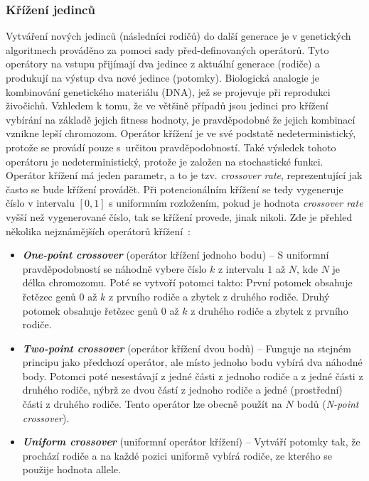 \subsubsection{Křížení jedinců}
\label{krizeniGA}
Vytváření nových jedinců (následníci rodičů) do další generace je v genetických algoritmech prováděno za pomoci sady před-definovaných operátorů. Tyto operátory na vstupu přijímají dva jedince z aktuální generace (rodiče) a produkují na výstup dva nové jedince (potomky). Biologická analogie je kombinování genetického materiálu (DNA), jež se projevuje při reprodukci živočichů. Vzhledem k tomu, že ve většině případů jsou jedinci pro křížení vybírání na základě jejich fitness hodnoty, je pravděpodobné že jejich kombinací vznikne lepší chromozom. Operátor křížení je ve své podstatě nedeterministický, protože se provádí pouze s~určitou pravděpodobností. Také výsledek tohoto operátoru je nedeterministický, protože je založen na stochastické funkci. Operátor křížení má jeden parametr, a to je tzv. \emph{crossover rate}, reprezentující jak často se bude křížení provádět. Při potencionálním křížení se tedy vygeneruje číslo v intervalu $[0,1]$ s uniformním rozložením, pokud je hodnota \emph{crossover rate} vyšší než vygenerované číslo, tak se křížení provede, jinak nikoli. Zde je přehled několika nejznámějších operátorů křížení~\cite{GAoptimisModel, GAstudy}:

\begin{itemize}
    \item \textbf{\emph{One-point crossover}} (operátor křížení jednoho bodu) -- S uniformní pravděpodobností se náhodně vybere číslo $k$ z intervalu $1$ až $N$, kde $N$ je délka chromozomu. Poté se vytvoří potomci takto: První potomek obsahuje řetězec genů $0$ až $k$ z prvního rodiče a zbytek z druhého rodiče. Druhý potomek obsahuje řetězec genů $0$ až $k$ z druhého rodiče a zbytek z prvního rodiče.
    \item \textbf{\emph{Two-point crossover}} (operátor křížení dvou bodů) -- Funguje na stejném principu jako předchozí operátor, ale místo jednoho bodu vybírá dva náhodné body. Potomci poté nesestávají z jedné části z jednoho rodiče a z jedné části z druhého rodiče, nýbrž ze dvou částí z jednoho rodiče a jedné (prostřední) části z druhého rodiče. Tento operátor lze obecně použít na $N$ bodů (\emph{N-point crossover}).
    \item \textbf{\emph{Uniform crossover}} (uniformní operátor křížení) -- Vytváří potomky tak, že prochází rodiče a na každé pozici uniformě vybírá rodiče, ze kterého se použije hodnota allele.
\end{itemize}


